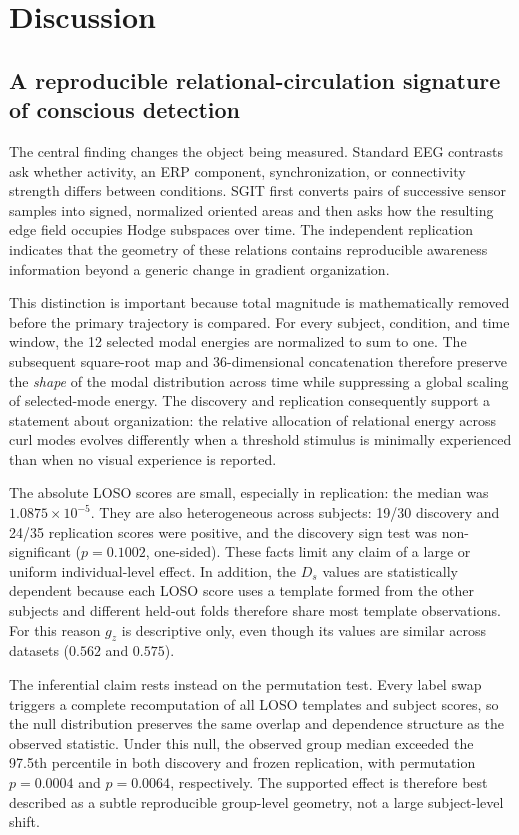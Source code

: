 \documentclass[12pt]{article}
\begin{document}
\section{Discussion}
\subsection{A reproducible relational-circulation signature of conscious detection}
The central finding changes the object being measured. Standard EEG contrasts ask whether activity, an ERP component, synchronization, or connectivity strength differs between conditions. SGIT first converts pairs of successive sensor samples into signed, normalized oriented areas and then asks how the resulting edge field occupies Hodge subspaces over time. The independent replication indicates that the geometry of these relations contains reproducible awareness information beyond a generic change in gradient organization.

This distinction is important because total magnitude is mathematically removed before the primary trajectory is compared. For every subject, condition, and time window, the 12 selected modal energies are normalized to sum to one. The subsequent square-root map and 36-dimensional concatenation therefore preserve the \emph{shape} of the modal distribution across time while suppressing a global scaling of selected-mode energy. The discovery and replication consequently support a statement about organization: the relative allocation of relational energy across curl modes evolves differently when a threshold stimulus is minimally experienced than when no visual experience is reported.

The absolute LOSO scores are small, especially in replication: the median was $1.0875\times10^{-5}$. They are also heterogeneous across subjects: 19/30 discovery and 24/35 replication scores were positive, and the discovery sign test was non-significant ($p=0.1002$, one-sided). These facts limit any claim of a large or uniform individual-level effect. In addition, the $D_s$ values are statistically dependent because each LOSO score uses a template formed from the other subjects and different held-out folds therefore share most template observations. For this reason $g_z$ is descriptive only, even though its values are similar across datasets ($0.562$ and $0.575$).

The inferential claim rests instead on the permutation test. Every label swap triggers a complete recomputation of all LOSO templates and subject scores, so the null distribution preserves the same overlap and dependence structure as the observed statistic. Under this null, the observed group median exceeded the 97.5th percentile in both discovery and frozen replication, with permutation $p=0.0004$ and $p=0.0064$, respectively. The supported effect is therefore best described as a subtle reproducible group-level geometry, not a large subject-level shift.
\end{document}
